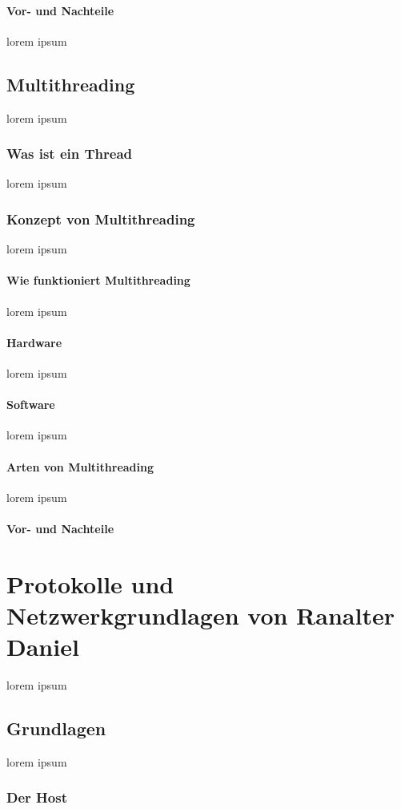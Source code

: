 \documentclass[12pt,a4paper]{report}
\begin{document}
\paragraph{Vor- und Nachteile}
lorem ipsum
\subsection{Multithreading}
lorem ipsum
\subsubsection{Was ist ein Thread}
lorem ipsum
\subsubsection{Konzept von Multithreading}
lorem ipsum
\paragraph{Wie funktioniert Multithreading}
lorem ipsum
\paragraph{Hardware}
lorem ipsum
\paragraph{Software}
lorem ipsum
\paragraph{Arten von Multithreading}
lorem ipsum
\paragraph{Vor- und Nachteile}


\section{Protokolle und Netzwerkgrundlagen von Ranalter Daniel}
lorem ipsum
\subsection{Grundlagen}
lorem ipsum
\subsubsection{Der Host}
\end{document}
